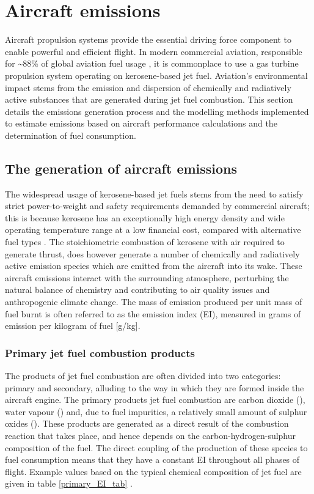 \section{Aircraft emissions}
\label{emissions}
Aircraft propulsion systems provide the essential driving force component to enable powerful and efficient flight. In modern commercial aviation, responsible for \textasciitilde88\% of global aviation fuel usage \cite{Gossling2020}, it is commonplace to use a gas turbine propulsion system operating on kerosene-based jet fuel. Aviation's environmental impact stems from the emission and dispersion of chemically and radiatively active substances that are generated during jet fuel combustion. This section details the emissions generation process and the modelling methods implemented to estimate emissions based on aircraft performance calculations and the determination of fuel consumption.

\subsection{The generation of aircraft emissions}
The widespread usage of kerosene-based jet fuels stems from the need to satisfy strict power-to-weight and safety requirements demanded by commercial aircraft; this is because kerosene has an exceptionally high energy density and wide operating temperature range at a low financial cost, compared with alternative fuel types \cite{Hemighaus2007, USDOE_2020}. The stoichiometric combustion of kerosene with air required to generate thrust, does however generate a number of chemically and radiatively active emission species which are emitted from the aircraft into its wake. These aircraft emissions interact with the surrounding atmosphere, perturbing the natural balance of chemistry and contributing to air quality issues and anthropogenic climate change. The mass of emission produced per unit mass of fuel burnt is often referred to as the emission index (EI), measured in grams of emission per kilogram of fuel [g/kg].

\subsubsection{Primary jet fuel combustion products}
The products of jet fuel combustion are often divided into two categories: primary and secondary, alluding to the way in which they are formed inside the aircraft engine. The primary products jet fuel combustion are carbon dioxide (), water vapour () and, due to fuel impurities, a relatively small amount of sulphur oxides (). These products are generated as a direct result of the combustion reaction that takes place, and hence depends on the carbon-hydrogen-sulphur composition of the fuel. The direct coupling of the production of these species to fuel consumption means that they have a constant EI throughout all phases of flight. Example values based on the typical chemical composition of jet fuel are given in table \ref{primary_EI_tab} \cite{IPCC1999}.

